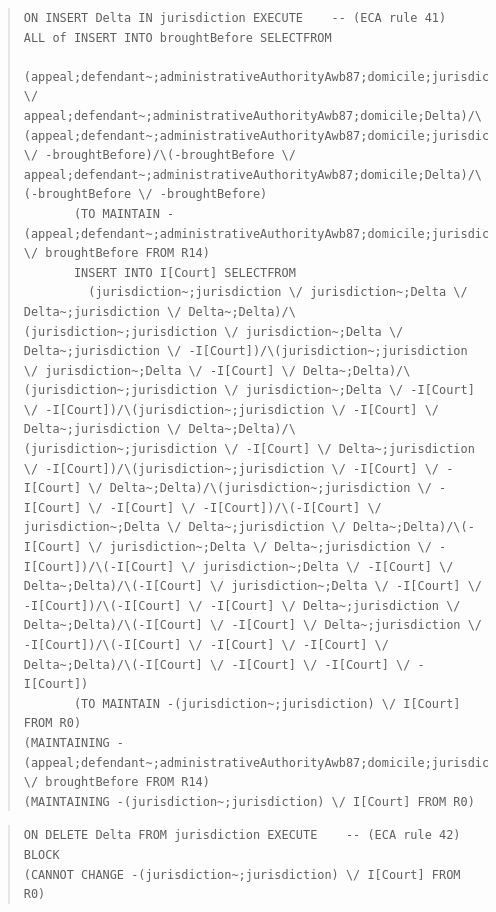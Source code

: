 \documentclass[10pt,a4paper]{report}              %
\theoremstyle{plain}\theorembodyfont{\rmfamily}\newtheorem{definition}{Definition}[section]
\theoremstyle{plain}\theorembodyfont{\rmfamily}\newtheorem{designrule}[definition]{Requirement}
\begin{document}
\begin{quote}
\begin{verbatim}
ON INSERT Delta IN jurisdiction EXECUTE    -- (ECA rule 41)
ALL of INSERT INTO broughtBefore SELECTFROM
         (appeal;defendant~;administrativeAuthorityAwb87;domicile;jurisdiction \/ appeal;defendant~;administrativeAuthorityAwb87;domicile;Delta)/\(appeal;defendant~;administrativeAuthorityAwb87;domicile;jurisdiction \/ -broughtBefore)/\(-broughtBefore \/ appeal;defendant~;administrativeAuthorityAwb87;domicile;Delta)/\(-broughtBefore \/ -broughtBefore)
       (TO MAINTAIN -(appeal;defendant~;administrativeAuthorityAwb87;domicile;jurisdiction) \/ broughtBefore FROM R14)
       INSERT INTO I[Court] SELECTFROM
         (jurisdiction~;jurisdiction \/ jurisdiction~;Delta \/ Delta~;jurisdiction \/ Delta~;Delta)/\(jurisdiction~;jurisdiction \/ jurisdiction~;Delta \/ Delta~;jurisdiction \/ -I[Court])/\(jurisdiction~;jurisdiction \/ jurisdiction~;Delta \/ -I[Court] \/ Delta~;Delta)/\(jurisdiction~;jurisdiction \/ jurisdiction~;Delta \/ -I[Court] \/ -I[Court])/\(jurisdiction~;jurisdiction \/ -I[Court] \/ Delta~;jurisdiction \/ Delta~;Delta)/\(jurisdiction~;jurisdiction \/ -I[Court] \/ Delta~;jurisdiction \/ -I[Court])/\(jurisdiction~;jurisdiction \/ -I[Court] \/ -I[Court] \/ Delta~;Delta)/\(jurisdiction~;jurisdiction \/ -I[Court] \/ -I[Court] \/ -I[Court])/\(-I[Court] \/ jurisdiction~;Delta \/ Delta~;jurisdiction \/ Delta~;Delta)/\(-I[Court] \/ jurisdiction~;Delta \/ Delta~;jurisdiction \/ -I[Court])/\(-I[Court] \/ jurisdiction~;Delta \/ -I[Court] \/ Delta~;Delta)/\(-I[Court] \/ jurisdiction~;Delta \/ -I[Court] \/ -I[Court])/\(-I[Court] \/ -I[Court] \/ Delta~;jurisdiction \/ Delta~;Delta)/\(-I[Court] \/ -I[Court] \/ Delta~;jurisdiction \/ -I[Court])/\(-I[Court] \/ -I[Court] \/ -I[Court] \/ Delta~;Delta)/\(-I[Court] \/ -I[Court] \/ -I[Court] \/ -I[Court])
       (TO MAINTAIN -(jurisdiction~;jurisdiction) \/ I[Court] FROM R0)
(MAINTAINING -(appeal;defendant~;administrativeAuthorityAwb87;domicile;jurisdiction) \/ broughtBefore FROM R14)
(MAINTAINING -(jurisdiction~;jurisdiction) \/ I[Court] FROM R0)
\end{verbatim}
\end{quote}
\begin{quote}
\begin{verbatim}
ON DELETE Delta FROM jurisdiction EXECUTE    -- (ECA rule 42)
BLOCK
(CANNOT CHANGE -(jurisdiction~;jurisdiction) \/ I[Court] FROM R0)
\end{verbatim}
\end{quote}
\end{document}
